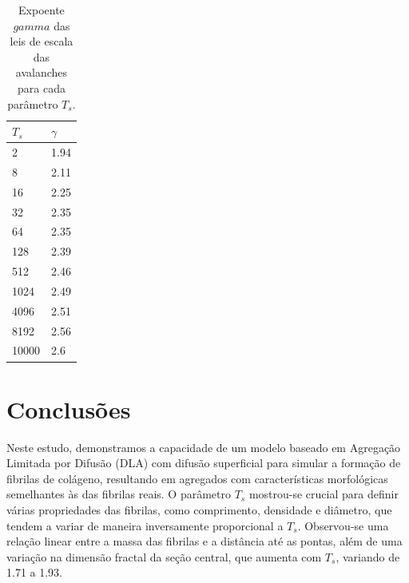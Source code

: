 \documentclass[11pt,a4paper]{article} %
\begin{document}
        \begin{table}[H]
            \caption{Expoente \(gamma\) das leis de escala das avalanches para cada parâmetro \(T_{s}\).}
            \centering
            \label{tab3} %
            \begin{tabular}{ll}
                \hline
                \textbf{\(T_{s}\)} & \textbf{\(\gamma\)} \\ \hline
                2                  & 1.94               \\
                8                  & 2.11               \\
                16                 & 2.25               \\
                32                 & 2.35               \\
                64                 & 2.35               \\
                128                & 2.39               \\
                512                & 2.46               \\
                1024               & 2.49               \\
                4096               & 2.51               \\
                8192               & 2.56               \\
                10000              & 2.6                \\ \hline
            \end{tabular}
        \end{table}
        
    
    \section{Conclusões}

    Neste estudo, demonstramos a capacidade de um modelo baseado em Agregação Limitada por Difusão (DLA) com difusão  
    superficial para simular a formação de fibrilas de colágeno, resultando em agregados com características morfológicas  
    semelhantes às das fibrilas reais. O parâmetro \(T_{s}\) mostrou-se crucial para definir várias propriedades das  
    fibrilas, como comprimento, densidade e diâmetro, que tendem a variar de maneira inversamente proporcional a \(T_{s}\).  
    Observou-se uma relação linear entre a massa das fibrilas e a distância até as pontas, além de uma variação na dimensão  
    fractal da seção central, que aumenta com \(T_{s}\), variando de 1.71 a 1.93. 
\end{document}
